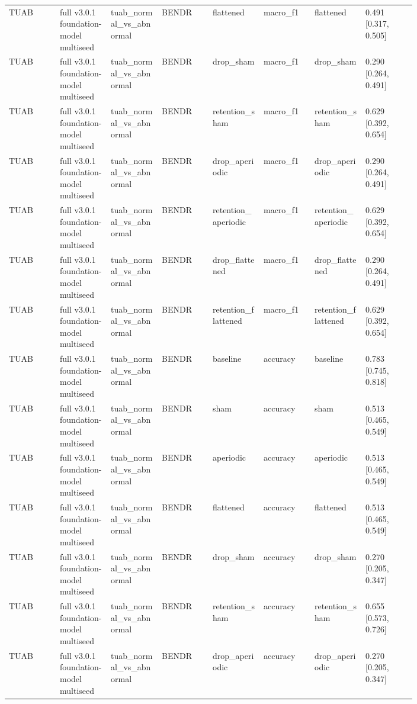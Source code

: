 \begin{longtable}{p{0.10\linewidth}p{0.10\linewidth}p{0.10\linewidth}p{0.10\linewidth}p{0.10\linewidth}p{0.10\linewidth}p{0.10\linewidth}p{0.10\linewidth}}
TUAB & full v3.0.1 foundation-model multiseed & tuab\_normal\_vs\_abnormal & BENDR & flattened & macro\_f1 & flattened & 0.491 [0.317, 0.505]\\
TUAB & full v3.0.1 foundation-model multiseed & tuab\_normal\_vs\_abnormal & BENDR & drop\_sham & macro\_f1 & drop\_sham & 0.290 [0.264, 0.491]\\
TUAB & full v3.0.1 foundation-model multiseed & tuab\_normal\_vs\_abnormal & BENDR & retention\_sham & macro\_f1 & retention\_sham & 0.629 [0.392, 0.654]\\
TUAB & full v3.0.1 foundation-model multiseed & tuab\_normal\_vs\_abnormal & BENDR & drop\_aperiodic & macro\_f1 & drop\_aperiodic & 0.290 [0.264, 0.491]\\
TUAB & full v3.0.1 foundation-model multiseed & tuab\_normal\_vs\_abnormal & BENDR & retention\_aperiodic & macro\_f1 & retention\_aperiodic & 0.629 [0.392, 0.654]\\
TUAB & full v3.0.1 foundation-model multiseed & tuab\_normal\_vs\_abnormal & BENDR & drop\_flattened & macro\_f1 & drop\_flattened & 0.290 [0.264, 0.491]\\
TUAB & full v3.0.1 foundation-model multiseed & tuab\_normal\_vs\_abnormal & BENDR & retention\_flattened & macro\_f1 & retention\_flattened & 0.629 [0.392, 0.654]\\
TUAB & full v3.0.1 foundation-model multiseed & tuab\_normal\_vs\_abnormal & BENDR & baseline & accuracy & baseline & 0.783 [0.745, 0.818]\\
TUAB & full v3.0.1 foundation-model multiseed & tuab\_normal\_vs\_abnormal & BENDR & sham & accuracy & sham & 0.513 [0.465, 0.549]\\
TUAB & full v3.0.1 foundation-model multiseed & tuab\_normal\_vs\_abnormal & BENDR & aperiodic & accuracy & aperiodic & 0.513 [0.465, 0.549]\\
TUAB & full v3.0.1 foundation-model multiseed & tuab\_normal\_vs\_abnormal & BENDR & flattened & accuracy & flattened & 0.513 [0.465, 0.549]\\
TUAB & full v3.0.1 foundation-model multiseed & tuab\_normal\_vs\_abnormal & BENDR & drop\_sham & accuracy & drop\_sham & 0.270 [0.205, 0.347]\\
TUAB & full v3.0.1 foundation-model multiseed & tuab\_normal\_vs\_abnormal & BENDR & retention\_sham & accuracy & retention\_sham & 0.655 [0.573, 0.726]\\
TUAB & full v3.0.1 foundation-model multiseed & tuab\_normal\_vs\_abnormal & BENDR & drop\_aperiodic & accuracy & drop\_aperiodic & 0.270 [0.205, 0.347]\\

\end{longtable}
